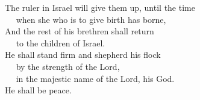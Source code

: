
\lettrine{T}{}he ruler in Israel will give them up, until the time\\
   when she who is to give birth has borne,\\
And the rest of his brethren shall return\\
   to the children of Israel.\\
He shall stand firm and shepherd his flock\\
   by the strength of the Lord,\\
   in the majestic name of the Lord, his God.\\
He shall be peace.